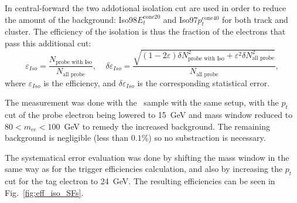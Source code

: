 In \Zee central-forward the two addotional isolation cut are used in order to reduce the amount of the background: Iso98$E_{t}^{\mathrm{cone20}}$ and Iso97$p_{t}^{\mathrm{cone40}}$ for both track and cluster. The efficiency of the isolation is thus the fraction of the electrons that pass this additional cut:
\begin{equation}
\varepsilon_{Iso} = \frac{N_\text{probe with Iso} }{ N_\text{all probe} }, \;\;\;\;
\delta \varepsilon_{Iso} = \frac{\sqrt{(1-2\varepsilon) \delta N_\text{probe with Iso}^2 + \varepsilon^2 \delta N_\text{all probe}^2}}
                                {N_\text{all probe}},
\end{equation}
where $\varepsilon_{Iso}$ is the efficiency, and $\delta \varepsilon_{Iso}$ is the corresponding statistical error.

The measurement was done with the \Zee\ sample with the same setup, with the $p_{t}$ cut of the probe electron being lowered to 15~GeV and mass window reduced to $80 < m_{ee} < 100$~GeV to remedy the increased background. The remaining background is negligible (less than $0.1$\%) so no substraction is necessary.

The systematical error evaluation was done by shifting the mass window in the same way as for the trigger efficiencies calculation, and also by increasing the $p_{t}$ cut for the tag electron to 24~GeV. The resulting efficiencies can be seen in Fig.~\ref{fig:eff_iso_SFs}.

\begin{figure}
\end{figure}
